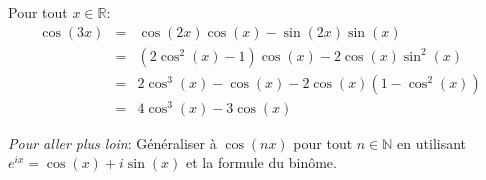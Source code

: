 Pour tout $x\in\mathbb{R}$:
\begin{eqnarray*}
  \cos(3x) &=& \cos(2x)\cos(x)-\sin(2x)\sin(x) \\
      &=& \left( 2\cos^2(x)-1 \right) \cos(x) - 2\cos(x)\sin^2(x) \\
      &=& 2\cos^3(x)-\cos(x)-2\cos(x)\left(1-\cos^2(x)\right) \\
      &=& 4\cos^3(x)-3\cos(x)
\end{eqnarray*}

\textit{Pour aller plus loin}: Généraliser à $\cos(nx)$ pour tout $n\in\mathbb{N}$ en utilisant $e^{ix}=\cos(x)+i\sin(x)$ et la formule du binôme.
